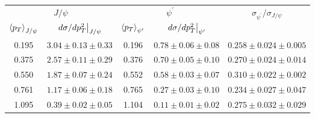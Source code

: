 \begin{tabular}{cc|cc|c}
\hline
\multicolumn{2}{c|}{$J/\psi$}                     & \multicolumn{2}{c|}{$\psi^{\prime}$}              & \multirow{2}{*}{$\sigma_{\psi^\prime}/\sigma_{J/\psi}$} \\ \cline{1-4}
$\expval{p_T}_{J/\psi}$ & $\eval{d\sigma/dp^2_T}_{J/\psi}$ & $\expval{p_T}_{\psi^\prime}$ & $\eval{d\sigma/dp^2_T}_{\psi^\prime}$ &  \\ \hline
\multicolumn{1}{c|}{0.195} & $3.04\pm0.13\pm0.33$ & \multicolumn{1}{c|}{0.196} & $0.78\pm0.06\pm0.08$ & $0.258\pm0.024\pm0.005$                                 \\
\multicolumn{1}{c|}{0.375} & $2.57\pm0.11\pm0.29$ & \multicolumn{1}{c|}{0.376} & $0.70\pm0.05\pm0.10$ & $0.270\pm0.024\pm0.014$                                 \\
\multicolumn{1}{c|}{0.550} & $1.87\pm0.07\pm0.24$ & \multicolumn{1}{c|}{0.552} & $0.58\pm0.03\pm0.07$ & $0.310\pm0.022\pm0.002$                                 \\
\multicolumn{1}{c|}{0.761} & $1.17\pm0.06\pm0.18$ & \multicolumn{1}{c|}{0.765} & $0.27\pm0.03\pm0.10$ & $0.234\pm0.027\pm0.047$                                 \\
\multicolumn{1}{c|}{1.095} & $0.39\pm0.02\pm0.05$ & \multicolumn{1}{c|}{1.104} & $0.11\pm0.01\pm0.02$ & $0.275\pm0.032\pm0.029$                                 \\ \hline
\end{tabular}
